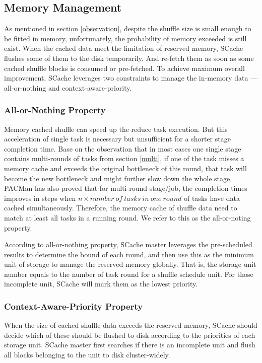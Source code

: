 \subsection{Memory Management}
As mentioned in section \ref{observation}, despite the shuffle size is small enough to be fitted in memory, unfortunately, the probability of memory exceeded is still exist. 
When the cached data meet the limitation of reserved memory, SCache flushes some of them to the disk temporarily. 
And re-fetch them as soon as some cached shuffle blocks is consumed or pre-fetched. To achieve maximum overall improvement, SCache leverages two constraints to manage the in-memory data --- all-or-nothing and context-aware-priority.

\subsubsection{All-or-Nothing Property}
Memory cached shuffle can speed up the reduce task execution. But this acceleration of single task is necessary but unsufficient for a shorter stage completion time. Base on the observation that in most cases one single stage contains multi-rounds of tasks from section \ref{multi}, if one of the task misses a memory cache and exceeds the original bottleneck of this round, that task will become the new bottleneck and might further slow down the whole stage. PACMan \cite{pacman} has also proved that for multi-round stage/job, the completion times improves in steps when $n\times number\ of\ tasks\ in\ one\ round$ of tasks have data cached simultaneously. Therefore, the memory cache of shuffle data need to match at least all tasks in a running round. We refer to this as the all-or-noting property. 

According to all-or-nothing property, SCache master leverages the pre-scheduled results to determine the bound of each round, and then use this as the minimum unit of storage to manage the reserved memory globally.
That is, the storage unit number equals to the number of task round for a shuffle schedule unit.
For those incomplete unit, SCache will mark them as the lowest priority.

\subsubsection{Context-Aware-Priority Property}
When the size of cached shuffle data exceeds the reserved memory, SCache should decide which of these should be flushed to disk according to the priorities of each storage unit. SCache master first searches if there is an incomplete unit and flush all blocks belonging to the unit to disk cluster-widely. 

